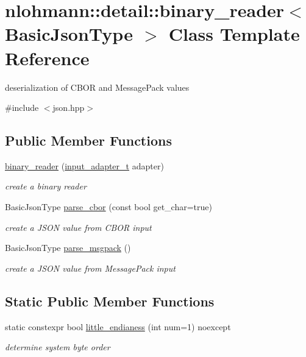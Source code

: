 \hypertarget{classnlohmann_1_1detail_1_1binary__reader}{}\section{nlohmann\+:\+:detail\+:\+:binary\+\_\+reader$<$ Basic\+Json\+Type $>$ Class Template Reference}
\label{classnlohmann_1_1detail_1_1binary__reader}


deserialization of C\+B\+OR and Message\+Pack values  




{\ttfamily \#include $<$json.\+hpp$>$}

\subsection*{Public Member Functions}
\begin{DoxyCompactItemize}
\item 
\hyperlink{classnlohmann_1_1detail_1_1binary__reader_a7e643baadaf4c31718cd74833bdd542f}{binary\+\_\+reader} (\hyperlink{namespacenlohmann_1_1detail_ae132f8cd5bb24c5e9b40ad0eafedf1c2}{input\+\_\+adapter\+\_\+t} adapter)
\begin{DoxyCompactList}\small\item\em create a binary reader \end{DoxyCompactList}\item 
Basic\+Json\+Type \hyperlink{classnlohmann_1_1detail_1_1binary__reader_a62f3849719a503b591c42c7d11820e68}{parse\+\_\+cbor} (const bool get\+\_\+char=true)
\begin{DoxyCompactList}\small\item\em create a J\+S\+ON value from C\+B\+OR input \end{DoxyCompactList}\item 
Basic\+Json\+Type \hyperlink{classnlohmann_1_1detail_1_1binary__reader_aa147833e4d64ebb6a08e5f6a7b9a2842}{parse\+\_\+msgpack} ()
\begin{DoxyCompactList}\small\item\em create a J\+S\+ON value from Message\+Pack input \end{DoxyCompactList}\end{DoxyCompactItemize}
\subsection*{Static Public Member Functions}
\begin{DoxyCompactItemize}
\item 
static constexpr bool \hyperlink{classnlohmann_1_1detail_1_1binary__reader_a1d8f70f95d241354f86a0b9ae711c1c3}{little\+\_\+endianess} (int num=1) noexcept
\begin{DoxyCompactList}\small\item\em determine system byte order \end{DoxyCompactList}\end{DoxyCompactItemize}


